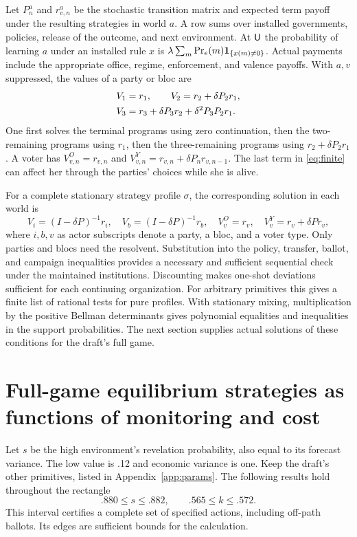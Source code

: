 \documentclass[11pt,letterpaper]{article}
\begin{document}
Let \(P_n^a\) and \(r_{v,n}^a\) be the stochastic transition matrix and expected term payoff under the resulting strategies in world \(a\). A row sums over installed governments, policies, release of the outcome, and next environment. At \(\mathsf U\) the probability of learning \(a\) under an installed rule \(x\) is \(\lambda\sum_m\Pr_e(m)\mathbf 1_{\{x(m)\ne0\}}\). Actual payments include the appropriate office, regime, enforcement, and valence payoffs. With \(a,v\) suppressed, the values of a party or bloc are
\begin{align}
 V_1&=r_1,\qquad V_2=r_2+\delta P_2r_1,\notag\\
 V_3&=r_3+\delta P_3r_2+\delta^2P_3P_2r_1 .\label{eq:finite}
\end{align}
One first solves the terminal programs using zero continuation, then the two-remaining programs using \(r_1\), then the three-remaining programs using \(r_2+\delta P_2r_1\). A voter has \(V^O_{v,n}=r_{v,n}\) and \(V^Y_{v,n}=r_{v,n}+\delta P_nr_{v,n-1}\). The last term in \eqref{eq:finite} can affect her through the parties' choices while she is alive.

For a complete stationary strategy profile \(\sigma\), the corresponding solution in each world is
\begin{equation}
 V_i=(I-\delta P)^{-1}r_i,\quad V_b=(I-\delta P)^{-1}r_b,\quad
 V_v^O=r_v,\quad V_v^Y=r_v+\delta P r_v,\label{eq:resolvent}
\end{equation}
where \(i,b,v\) as actor subscripts denote a party, a bloc, and a voter type. Only parties and blocs need the resolvent. Substitution into the policy, transfer, ballot, and campaign inequalities provides a necessary and sufficient sequential check under the maintained institutions. Discounting makes one-shot deviations sufficient for each continuing organization. For arbitrary primitives this gives a finite list of rational tests for pure profiles. With stationary mixing, multiplication by the positive Bellman determinants gives polynomial equalities and inequalities in the support probabilities. The next section supplies actual solutions of these conditions for the draft's full game.

\newpage
\section{Full-game equilibrium strategies as functions of monitoring and cost}\label{sec:chamber}
Let \(s\) be the high environment's revelation probability, also equal to its forecast variance. The low value is .12 and economic variance is one. Keep the draft's other primitives, listed in Appendix~\ref{app:params}. The following results hold throughout the rectangle
\begin{equation}
 .880\le s\le .882,\qquad .565\le k\le .572 .\label{eq:band}
\end{equation}
This interval certifies a complete set of specified actions, including off-path ballots. Its edges are sufficient bounds for the calculation.
\end{document}
